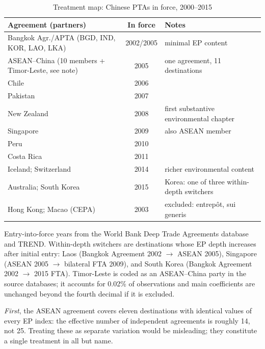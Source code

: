 \documentclass[12pt]{article}
\begin{document}
\begin{table}[htbp]
\centering
\caption{Treatment map: Chinese PTAs in force, 2000--2015}
\label{tab:treatment}
\small
\begin{threeparttable}
\begin{tabular}{lcl}
\toprule
Agreement (partners) & In force & Notes \\
\midrule
Bangkok Agr./APTA (BGD, IND, KOR, LAO, LKA) & 2002/2005 & minimal EP content \\
ASEAN--China (10 members + Timor-Leste, see note) & 2005 & one agreement, 11 destinations \\
Chile & 2006 & \\
Pakistan & 2007 & \\
New Zealand & 2008 & first substantive environmental chapter \\
Singapore & 2009 & also ASEAN member \\
Peru & 2010 & \\
Costa Rica & 2011 & \\
Iceland; Switzerland & 2014 & richer environmental content \\
Australia; South Korea & 2015 & Korea: one of three within-depth switchers \\
\midrule
Hong Kong; Macao (CEPA) & 2003 & excluded: entrepôt, sui generis \\
\bottomrule
\end{tabular}
\begin{tablenotes}\footnotesize
\item Entry-into-force years from the World Bank Deep Trade Agreements database and TREND.
Within-depth switchers are destinations whose EP depth increases after initial entry:
Laos (Bangkok Agreement 2002 $\to$ ASEAN 2005), Singapore (ASEAN 2005 $\to$ bilateral
FTA 2009), and South Korea (Bangkok Agreement 2002 $\to$ 2015 FTA). Timor-Leste is
coded as an ASEAN--China party in the source databases; it accounts for 0.02\% of
observations and main coefficients are unchanged beyond the fourth decimal if it is
excluded.
\end{tablenotes}
\end{threeparttable}
\end{table}

\emph{First}, the ASEAN agreement covers eleven destinations with identical values of
every EP index: the effective number of independent agreements is roughly 14, not 25.
Treating these as separate variation would be misleading; they constitute a single
treatment in all but name.
\end{document}
